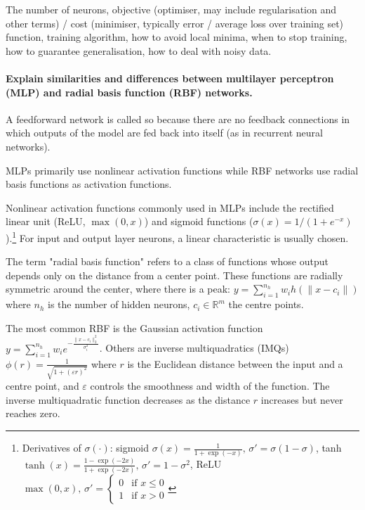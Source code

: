 The number of neurons,
objective (optimiser, may include regularisation and other terms) / cost (minimiser, typically error / average loss over training set) function,
training algorithm,
how to avoid local minima, 
when to stop training,
how to guarantee generalisation,
how to deal with noisy data.

\paragraph{Explain similarities and differences between multilayer perceptron (MLP) and radial basis function (RBF) networks.}

A feedforward network is called so because there are no feedback connections in which outputs of the model are fed back into itself (as in recurrent neural networks).

MLPs primarily use nonlinear activation functions
while RBF networks use radial basis functions as activation functions.

Nonlinear activation functions commonly used in MLPs include the
rectified linear unit (ReLU, $\max(0, x)$) and sigmoid functions ($\sigma(x) = 1 / (1 + e^{-x})$).\footnote{
    Derivatives of $\sigma(\cdot)$:
    sigmoid $\sigma(x) = \frac{1}{1 + \exp(-x)}, \, \sigma' = \sigma (1 - \sigma)$,
    tanh $\tanh(x) = \frac{1 - \exp(-2x)}{1 + \exp(-2x)}, \, \sigma' = 1 - \sigma^2$,
    ReLU $\max(0, x), \, \sigma' = \begin{cases}
        0 & \text{if } x \leq 0 \\
        1 & \text{if } x > 0
    \end{cases}$
} For input and output layer neurons, a linear characteristic is usually chosen.

The term "radial basis function" refers to a class of functions whose output depends only on the distance from a center point.
These functions are radially symmetric around the center, where there is a peak:
$y = \sum_{i=1}^{n_h}{w_i h(\lVert x - c_i \rVert)}$ where $n_h$ is the number of hidden neurons, $c_i \in \mathbb{R}^m$ the centre points.

The most common RBF is the Gaussian activation function $y = \sum_{i=1}^{n_h}{w_i e^{- \frac{\lVert x - c_i \rVert_2^2}{\sigma_i^2}} }$.
Others are inverse multiquadratics (IMQs) $\phi(r) = \frac{1}{\sqrt{1 + (\varepsilon r)^2}}$
where $r$ is the Euclidean distance between the input and a centre point, and $\varepsilon$ controls the smoothness and width of the function.
The inverse multiquadratic function decreases as the distance $r$ increases but never reaches zero.

